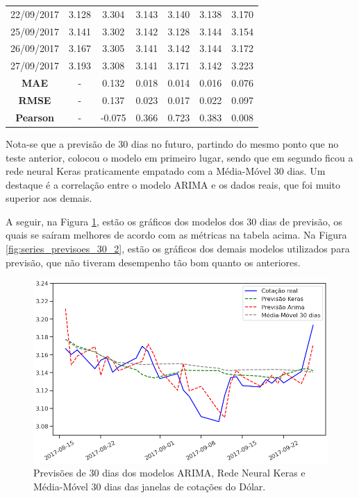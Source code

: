 \begin{longtable}{|c|c|c|c|c|c|c|}
22/09/2017 & 3.128 & 3.304 & 3.143 & 3.140 & 3.138 & 3.170 \\
25/09/2017 & 3.141 & 3.302 & 3.142 & 3.128 & 3.144 & 3.154 \\
26/09/2017 & 3.167 & 3.305 & 3.141 & 3.142 & 3.144 & 3.172 \\
27/09/2017 & 3.193 & 3.308 & 3.141 & 3.171 & 3.142 & 3.223 \\
\hline
\hline
\textbf{MAE} & - & 0.132 & 0.018 & 0.014 & 0.016 & 0.076 \\
\textbf{RMSE} & - & 0.137 & 0.023 & 0.017 & 0.022 & 0.097 \\
\textbf{Pearson} & - & -0.075 & 0.366 & 0.723 & 0.383 & 0.008 \\

\end{longtable}
\normalsize

Nota-se que a previsão de $30$ dias no futuro, partindo do mesmo ponto que no teste anterior, colocou o modelo  em primeiro lugar, sendo que em segundo ficou a rede neural Keras praticamente empatado com a Média-Móvel $30$ dias. Um destaque é a correlação entre o modelo ARIMA e os dados reais, que foi muito superior aos demais.

A seguir, na Figura \ref{fig:series_previsoes_30_1}, estão os gráficos dos modelos dos $30$ dias de previsão, os quais se saíram melhores de acordo com as métricas na tabela acima. Na Figura \ref{fig:series_previsoes_30_2}, estão os gráficos dos demais modelos utilizados para previsão, que não tiveram desempenho tão bom quanto os anteriores.

\begin{figure}[htb]
\centering
\includegraphics[width=13.1cm]{figuras/series_previsoes_30_1}
\caption{Previsões de $30$ dias dos modelos ARIMA, Rede Neural Keras e Média-Móvel $30$ dias das janelas de cotações do Dólar.}
\label{fig:series_previsoes_30_1}
\end{figure}

